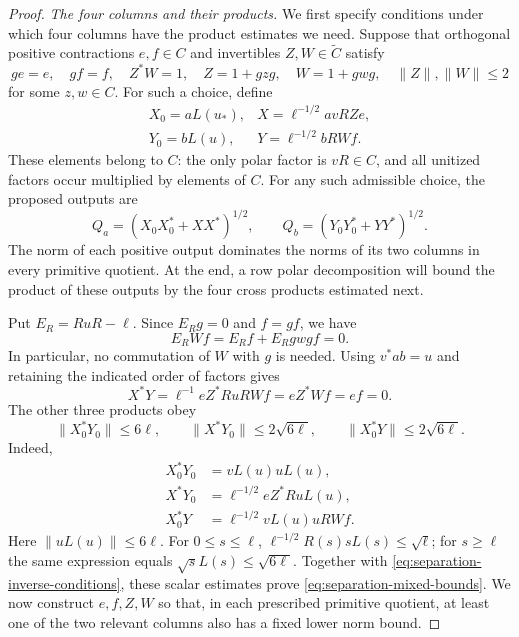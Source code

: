 \begin{proof}
\medskip\noindent\textit{The four columns and their products.}
We first specify conditions under which four columns have the product
estimates we need.  Suppose that orthogonal positive contractions
$e,f\in C$ and invertibles $Z,W\in\widetilde C$ satisfy
\begin{equation}\label{eq:separation-inverse-conditions}
 ge=e,\quad gf=f,\quad Z^*W=1,\quad
 Z=1+gzg,\quad W=1+gwg,\quad
 \|Z\|,\|W\|\le2
\end{equation}
for some $z,w\in C$.  For such a choice, define
\begin{equation}\label{eq:separation-four-columns}
 \begin{array}{ll}
 X_0=aL(u_*),&X=\ell^{-1/2}avRZe,\\[2pt]
 Y_0=bL(u),&Y=\ell^{-1/2}bRWf.
 \end{array}
\end{equation}
These elements belong to $C$: the only polar factor is $vR\in C$,
and all unitized factors occur multiplied by elements of $C$.
For any such admissible choice, the proposed outputs are
\begin{equation}\label{eq:separation-final-positives}
 Q_a=(X_0X_0^*+XX^*)^{1/2},\qquad
 Q_b=(Y_0Y_0^*+YY^*)^{1/2}.
\end{equation}
The norm of each positive output dominates the norms of its two
columns in every primitive quotient.  At the end, a row polar
decomposition will bound the product of these outputs by the four
cross products estimated next.

Put $E_R=RuR-\ell$.  Since $E_Rg=0$ and $f=gf$, we have
\[
 E_RWf=E_Rf+E_Rgwgf=0.
\]
In particular, no commutation of $W$ with $g$ is needed.  Using
$v^*ab=u$ and retaining the indicated order of factors gives
\begin{equation}\label{eq:separation-high-orthogonality}
 X^*Y=\ell^{-1}eZ^*RuRWf=eZ^*Wf=ef=0.
\end{equation}
The other three products obey
\begin{equation}\label{eq:separation-mixed-bounds}
 \|X_0^*Y_0\|\le6\ell,\qquad
 \|X^*Y_0\|\le2\sqrt{6\ell},\qquad
 \|X_0^*Y\|\le2\sqrt{6\ell}.
\end{equation}
Indeed,
\begin{align*}
 X_0^*Y_0&=vL(u)uL(u),\\
 X^*Y_0&=\ell^{-1/2}eZ^*RuL(u),\\
 X_0^*Y&=\ell^{-1/2}vL(u)uRWf.
\end{align*}
Here $\|uL(u)\|\le6\ell$.  For $0\le s\le\ell$,
$\ell^{-1/2}R(s)sL(s)\le\sqrt\ell$; for $s\ge\ell$ the same
expression equals $\sqrt{s}L(s)\le\sqrt{6\ell}$.
Together with \eqref{eq:separation-inverse-conditions}, these scalar
estimates prove \eqref{eq:separation-mixed-bounds}.
We now construct $e,f,Z,W$ so that, in each prescribed primitive
quotient, at least one of the two relevant columns also has a fixed
lower norm bound.


\end{proof}
